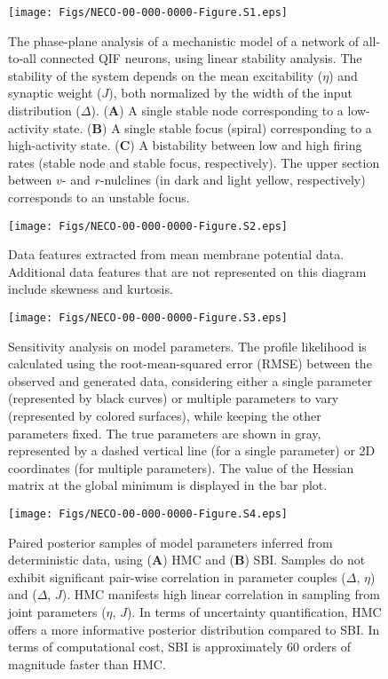 \documentclass[12pt]{article}
\begin{document}
\begin{figure}[ht]
    \centering
    \texttt{[image: Figs/NECO-00-000-0000-Figure.S1.eps]}
    \renewcommand{\thefigure}{S\arabic{figure}}
    \caption{The phase-plane analysis of a mechanistic model of a network of all-to-all connected QIF neurons, using linear stability analysis. The stability of the system depends on the mean excitability ($\eta$) and synaptic weight ($J$), both normalized by the width of the input distribution ($\Delta$). (\textbf{A}) A single stable node corresponding to a low-activity state. (\textbf{B}) A single stable focus (spiral) corresponding to a high-activity state. (\textbf{C}) A bistability between low and high firing rates (stable node and stable focus, respectively). The upper section between $v$- and $r$-nulclines (in dark and light yellow, respectively) corresponds to an unstable focus. }
    \label{fig:MPR_Istep_phaseplanes}
\end{figure}


\begin{figure}[ht]
    \centering
    \texttt{[image: Figs/NECO-00-000-0000-Figure.S2.eps]}
    \renewcommand{\thefigure}{S\arabic{figure}}
    \caption{Data features extracted from mean membrane potential data. Additional data features that are not represented on this diagram include skewness and kurtosis.}
    \label{fig:DataFeatures}
\end{figure}


\begin{figure}[ht]
    \centering
    \texttt{[image: Figs/NECO-00-000-0000-Figure.S3.eps]}
    \renewcommand{\thefigure}{S\arabic{figure}}
    \caption{Sensitivity analysis on model parameters.  The profile likelihood is calculated using the root-mean-squared error (RMSE) between the observed and generated data, considering either a single parameter (represented by black curves) or multiple parameters to vary (represented by colored surfaces), while keeping the other parameters fixed. The true parameters are shown in gray, represented by a dashed vertical line (for a single parameter) or 2D coordinates (for multiple parameters).  The value of the Hessian matrix at the global minimum is displayed in the bar plot.}
    \label{fig:SensitivityAnalysis}
\end{figure}


\begin{figure}[ht]
    \centering
    \texttt{[image: Figs/NECO-00-000-0000-Figure.S4.eps]}
    \renewcommand{\thefigure}{S\arabic{figure}}
            \caption{Paired posterior samples of model parameters inferred from deterministic data, using (\textbf{A}) HMC and (\textbf{B}) SBI. Samples do not exhibit significant pair-wise correlation in parameter couples ($\Delta$, $\eta$) and ($\Delta$, $J$). HMC manifests high linear correlation in sampling from joint parameters ($\eta$, $J$). In terms of uncertainty quantification, HMC offers a more informative posterior distribution compared to SBI. In terms of computational cost, SBI is approximately 60 orders of magnitude faster than HMC.}
    \label{fig:ODE_joint_posterior}
\end{figure}
\end{document}
